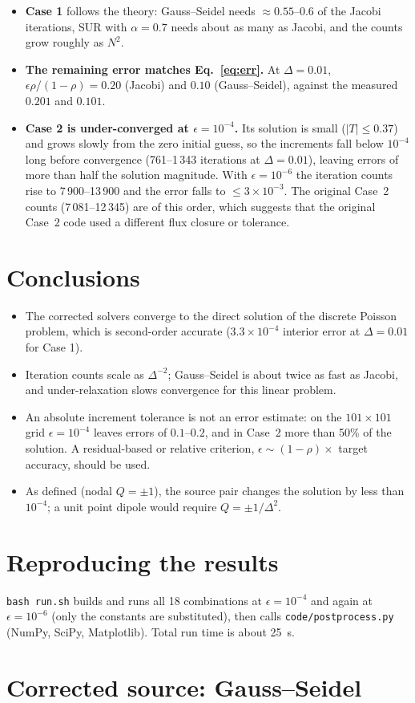 \begin{itemize}
\item \textbf{Case 1} follows the theory: Gauss--Seidel needs $\approx0.55$--$0.6$ of the Jacobi iterations, SUR with $\alpha=0.7$ needs about as many as Jacobi, and the counts grow roughly as $N^2$.
\item \textbf{The remaining error matches Eq.~\eqref{eq:err}.} At $\Delta=0.01$, $\epsilon\rho/(1-\rho)=0.20$ (Jacobi) and $0.10$ (Gauss--Seidel), against the measured $0.201$ and $0.101$.
\item \textbf{Case 2 is under-converged at $\epsilon=10^{-4}$.} Its solution is small ($|T|\le0.37$) and grows slowly from the zero initial guess, so the increments fall below $10^{-4}$ long before convergence (761--1\,343 iterations at $\Delta=0.01$), leaving errors of more than half the solution magnitude. With $\epsilon=10^{-6}$ the iteration counts rise to 7\,900--13\,900 and the error falls to $\le3\times10^{-3}$. The original Case~2 counts (7\,081--12\,345) are of this order, which suggests that the original Case~2 code used a different flux closure or tolerance.
\end{itemize}

\section{Conclusions}
\begin{itemize}
\item The corrected solvers converge to the direct solution of the discrete Poisson problem, which is second-order accurate ($3.3\times10^{-4}$ interior error at $\Delta=0.01$ for Case 1).
\item Iteration counts scale as $\Delta^{-2}$; Gauss--Seidel is about twice as fast as Jacobi, and under-relaxation slows convergence for this linear problem.
\item An absolute increment tolerance is not an error estimate: on the $101\times101$ grid $\epsilon=10^{-4}$ leaves errors of $0.1$--$0.2$, and in Case~2 more than 50\% of the solution. A residual-based or relative criterion, $\epsilon\sim(1-\rho)\times$ target accuracy, should be used.
\item As defined (nodal $Q=\pm1$), the source pair changes the solution by less than $10^{-4}$; a unit point dipole would require $Q=\pm1/\Delta^2$.
\end{itemize}

\section*{Reproducing the results}
\texttt{bash run.sh} builds and runs all 18 combinations at $\epsilon=10^{-4}$ and again at $\epsilon=10^{-6}$ (only the constants are substituted), then calls \texttt{code/postprocess.py} (NumPy, SciPy, Matplotlib). Total run time is about 25~s.

\appendix\section{Corrected source: Gauss--Seidel}


